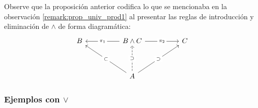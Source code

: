 \documentclass{article}
\begin{document}
\begin{remark}
    Observe que la proposición anterior codifica lo que se mencionaba en la observación
    \ref{remark:prop_univ_prod1} al presentar las reglas de introducción y eliminación de $\land$
    de forma diagramática:
    \[\begin{tikzcd}
    	B && {B \land C} && C \\
    	\\
    	&& A
    	\arrow["\supset"{description}, from=3-3, to=1-5]
    	\arrow["\subset"{description}, from=3-3, to=1-1]
    	\arrow["\pi_1"{description}, from=1-3, to=1-1]
    	\arrow["\pi_2"{description}, from=1-3, to=1-5]
    	\arrow["\supset"{description}, dashed, from=3-3, to=1-3]
    \end{tikzcd}\]
\end{remark}

\subsubsection{Ejemplos con $\vee$}
\end{document}
